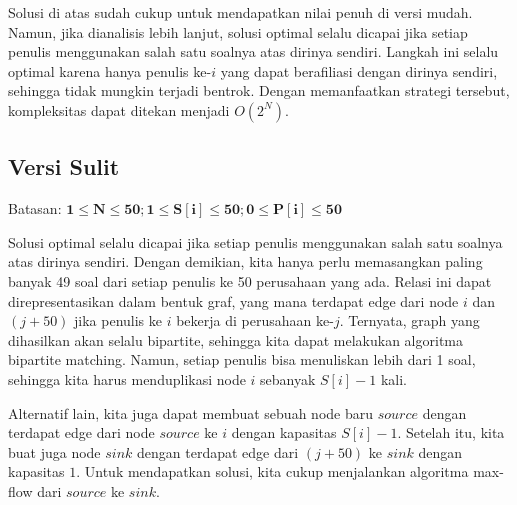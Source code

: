 \documentclass[../main_editorial.tex]{subfiles} %
\begin{document}
Solusi di atas sudah cukup untuk mendapatkan nilai penuh di versi mudah. Namun, jika dianalisis lebih lanjut, solusi optimal selalu dicapai jika setiap penulis menggunakan salah satu soalnya atas dirinya sendiri. Langkah ini selalu optimal karena hanya penulis ke-$i$ yang dapat berafiliasi dengan dirinya sendiri, sehingga tidak mungkin terjadi bentrok. Dengan memanfaatkan strategi tersebut, kompleksitas dapat ditekan menjadi $O(2^N)$.


\subsection*{Versi Sulit}

Batasan:
$\mathbf{1 \le N \le 50; 1 \le S[i] \le 50; 0 \le P[i] \le 50}$

Solusi optimal selalu dicapai jika setiap penulis menggunakan salah satu soalnya atas dirinya sendiri. Dengan demikian, kita hanya perlu memasangkan paling banyak 49 soal dari setiap penulis ke 50 perusahaan yang ada. Relasi ini dapat direpresentasikan dalam bentuk graf, yang mana terdapat edge dari node $i$ dan $(j+50)$ jika penulis ke $i$ bekerja di perusahaan ke-$j$. Ternyata, graph yang dihasilkan akan selalu bipartite, sehingga kita dapat melakukan algoritma bipartite matching. Namun, setiap penulis bisa menuliskan lebih dari 1 soal, sehingga kita harus menduplikasi node $i$ sebanyak $S[i]-1$ kali. 

Alternatif lain, kita juga dapat membuat sebuah node baru $source$ dengan terdapat edge dari node $source$ ke $i$ dengan kapasitas $S[i] - 1$. Setelah itu, kita buat juga node $sink$ dengan terdapat edge dari $(j+50)$ ke $sink$ dengan kapasitas $1$. Untuk mendapatkan solusi, kita cukup menjalankan algoritma max-flow dari $source$ ke $sink$.
\end{document}
